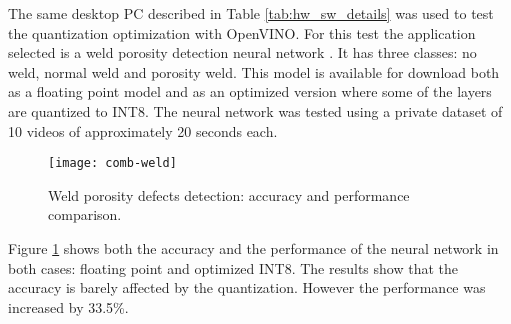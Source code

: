 The same desktop PC described in Table \ref{tab:hw_sw_details} was used to test the quantization optimization with OpenVINO. For this test the application selected is a weld porosity detection neural network \cite{weld}. It has three classes: no weld, normal weld and porosity weld. This model is available for download both as a floating point model and as an optimized version where some of the layers are quantized to INT8. The neural network was tested using a private dataset of 10 videos of approximately 20 seconds each.

\begin{figure}[thbp]
	\centering
	\texttt{[image: comb-weld]}
	\caption{Weld porosity defects detection: accuracy and performance comparison.}
	\label{fig:comb-weld}
\end{figure}

Figure \ref{fig:comb-weld} shows both the accuracy and the performance of the neural network in both cases: floating point and optimized INT8. The results show that the accuracy is barely affected by the quantization. However the performance was increased by 33.5\%.
